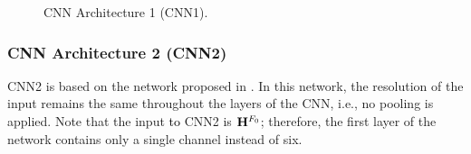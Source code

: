 \documentclass{article}
\newcommand{\gp}[1]{{\textcolor{black}{#1}}}
\newcommand{\gpcor}[2]{{\textcolor{black}{#2}}}
\newcommand{\secmt}[1]{}
\newcommand{\jbcor}[2]{{\textcolor{black}{#2}}}
\begin{document}
\begin{figure}
 \centerline{}
 \caption{CNN Architecture 1 (CNN1). \secmt{black lines on blue bf not visible, try to use yellow and make the lines thicker}}
 \label{fig:CNN-architecture-1}
\end{figure}

\subsubsection{CNN Architecture 2 (CNN2)}\label{subsubsec:CNN2}
CNN2 is based on the network proposed in \cite{bittner2017_deep}. In this network, the resolution of the input remains the same throughout the layers of the CNN, i.e., no pooling is applied. Note that the input \jbcor{the}{to} CNN2 is $\mathbf{H}^{F_{0}}$; therefore, the first layer of the network contains only a single channel instead of six. 

\end{document}
